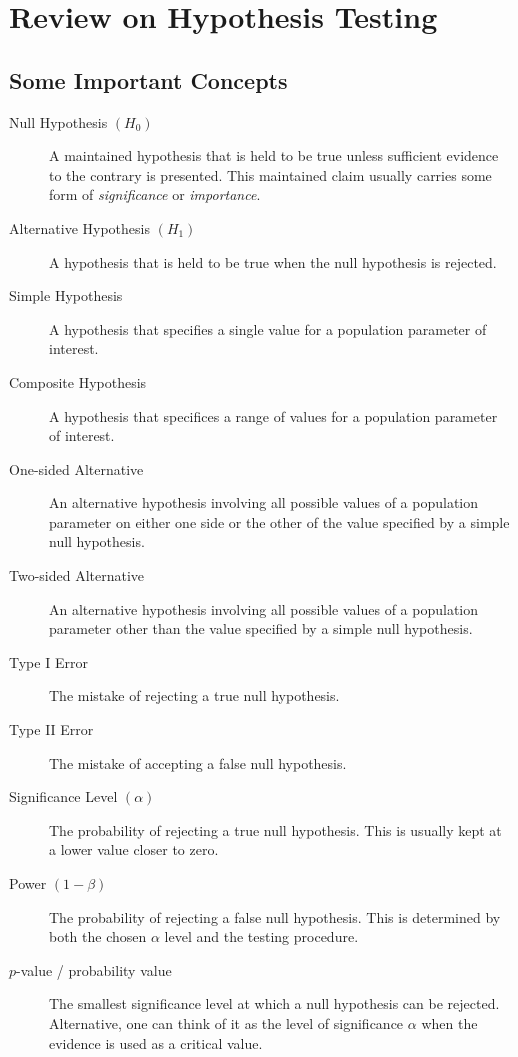 \documentclass[12pt]{book}
\begin{document}
\chapter{Review on Hypothesis Testing}

\section{Some Important Concepts}

\begin{description}
\item[Null Hypothesis $\left( H_{0}\right) $]  A maintained hypothesis that
is held to be true unless sufficient evidence to the contrary is presented.
This maintained claim usually carries some form of \emph{significance} or 
\emph{importance}.

\item[Alternative Hypothesis $\left( H_{1}\right) $]  A hypothesis that is
held to be true when the null hypothesis is rejected.

\item[Simple Hypothesis]  A hypothesis that specifies a single value for a
population parameter of interest.

\item[Composite Hypothesis]  A hypothesis that specifices a range of values
for a population parameter of interest.

\item[One-sided Alternative]  An alternative hypothesis involving all
possible values of a population parameter on either one side or the other of
the value specified by a simple null hypothesis.

\item[Two-sided Alternative]  An alternative hypothesis involving all
possible values of a population parameter other than the value specified by
a simple null hypothesis.

\item[Type I Error]  The mistake of rejecting a true null hypothesis.

\item[Type II Error]  The mistake of accepting a false null hypothesis.

\item[Significance Level $\left( \alpha \right) $]  The probability of
rejecting a true null hypothesis. This is usually kept at a lower value
closer to zero.

\item[Power $\left( 1-\beta \right) $]  The probability of rejecting a false
null hypothesis. This is determined by both the chosen $\alpha $ level and
the testing procedure.

\item[$p$-value / probability value]  The smallest significance level at
which a null hypothesis can be rejected. Alternative, one can think of it as
the level of significance $\alpha $ when the evidence is used as a critical
value.
\end{description}
\end{document}
